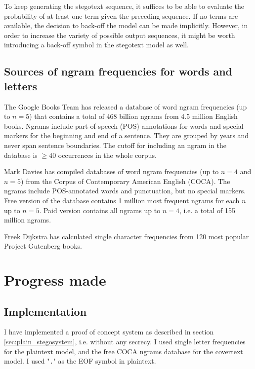 \documentclass[12pt,twoside,a4paper]{article}
\makeatletter
\newcommand*{\ie}{i.e.\@\xspace}
\makeatother
\begin{document}
To keep generating the stegotext sequence, it suffices to be able to evaluate the probability of at least one term given the preceding sequence. If no terms are available, the decision to back-off the model can be made implicitly. However, in order to increase the variety of possible output sequences, it might be worth introducing a back-off symbol in the stegotext model as well.

\subsection{Sources of ngram frequencies for words and letters}

The Google Books Team has released a database of word ngram frequencies (up to $n=5$) that contains a total of 468 billion ngrams from 4.5 million English books. \cite{googlengrams2011} Ngrams include part-of-speech (POS) annotations for words and special markers for the beginning and end of a sentence. They are grouped by years and never span sentence boundaries. The cutoff for including an ngram in the database is $\ge40$ occurrences in the whole corpus.

Mark Davies has compiled databases of word ngram frequencies (up to $n=4$ and $n=5$) from the Corpus of Contemporary American English (COCA). \cite{coca2010, web:byu_ngrams} The ngrams include POS-annotated words and punctuation, but no special markers. Free version of the database contains 1 million most frequent ngrams for each $n$ up to $n=5$. Paid version contains all ngrams up to $n=4$, \ie a total of 155 million ngrams.

Freek Dijkstra has calculated single character frequencies from 120 most popular Project Gutenberg books. \cite{web:letter_distribution}

\section{Progress made}

\subsection{Implementation}

I have implemented a proof of concept system as described in section \ref{sec:plain_stegosystem}, \ie without any secrecy. I used single letter frequencies for the plaintext model, and the free COCA ngrams database for the covertext model. I used "\texttt{.}" as the EOF symbol in plaintext.
\end{document}
